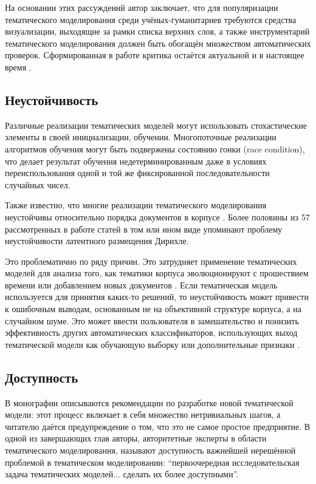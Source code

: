 На основании этих рассуждений автор заключает, что для популяризации тематического моделирования среди учёных-гуманитариев требуются средства визуализации, выходящие за рамки списка верхних слов, а также инструментарий тематического моделирования должен быть обогащён множеством автоматических проверок. Сформированная в работе критика остаётся актуальной и в настоящее время \cite{paakkonen2020humanistic}. 

\subsection{Неустойчивость}

Различные реализации тематических моделей могут использовать стохастические элементы в своей инициализации, обучении. Многопоточные реализации алгоритмов обучения могут быть подвержены состоянию гонки (race condition), что делает результат обучения недетерминированным даже в условиях переиспользования одной и той же фиксированной последовательности случайных чисел.

Также известно, что многие реализации тематического моделирования неустойчивы относительно порядка документов в корпусе \cite{agrawal2018wrong}. Более половины из 57 рассмотренных в работе \cite{agrawal2018wrong} статей в том или ином виде упоминают проблему неустойчивости латентного размещения Дирихле.

Это проблематично по ряду причин. Это затрудняет применение тематических моделей для анализа того, как тематики корпуса эволюционируют с прошествием времени или добавлением новых документов \cite{mehta_clustering_bank}. Если тематическая модель используется для принятия каких-то решений, то неустойчивость может привести к ошибочным выводам, основанным не на объективной структуре корпуса, а на случайном шуме\cite{mantyla2018measuring}. Это может ввести пользователя в замешательство и понизить эффективность других автоматических классификаторов, использующих выход тематической модели как обучающую выборку или дополнительные признаки \cite{agrawal2018wrong}.

\subsection{Доступность}

В монографии \cite{fntir2017applications} описываются рекомендации по разработке новой тематической модели: этот процесс включает в себя множество нетривиальных шагов, а читателю даётся предупреждение о том, что это не самое простое предприятие. В одной из завершающих глав авторы, авторитетные эксперты в области тематического моделирования, называют доступность важнейшей нерешённой проблемой в тематическом моделировании: ``первоочередная исследовательская задача тематических моделей... сделать их более доступными''.


